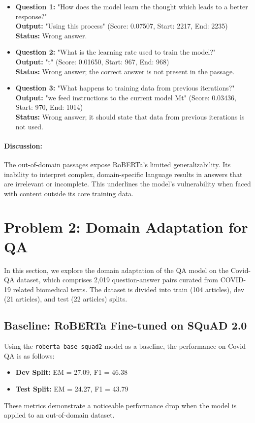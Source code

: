 \documentclass[11pt]{article}
\begin{document}
\begin{itemize}
    \item \textbf{Question 1:} "How does the model learn the thought which leads to a better response?" \\
          \textbf{Output:} "Using this process" (Score: 0.07507, Start: 2217, End: 2235) \\
          \textbf{Status:} Wrong answer.
    \item \textbf{Question 2:} "What is the learning rate used to train the model?" \\
          \textbf{Output:} "t" (Score: 0.01650, Start: 967, End: 968) \\
          \textbf{Status:} Wrong answer; the correct answer is not present in the passage.
    \item \textbf{Question 3:} "What happens to training data from previous iterations?" \\
          \textbf{Output:} "we feed instructions to the current model Mt" (Score: 0.03436, Start: 970, End: 1014) \\
          \textbf{Status:} Wrong answer; it should state that data from previous iterations is not used.
\end{itemize}
\paragraph{Discussion:} The out-of-domain passages expose RoBERTa's limited generalizability. Its inability to interpret complex, domain-specific language results in answers that are irrelevant or incomplete. This underlines the model's vulnerability when faced with content outside its core training data.

\section{Problem 2: Domain Adaptation for QA}
In this section, we explore the domain adaptation of the QA model on the Covid-QA dataset, which comprises 2,019 question-answer pairs curated from COVID-19 related biomedical texts. The dataset is divided into train (104 articles), dev (21 articles), and test (22 articles) splits.

\subsection{Baseline: RoBERTa Fine-tuned on SQuAD 2.0}
Using the \texttt{roberta-base-squad2} model as a baseline, the performance on Covid-QA is as follows:
\begin{itemize}
    \item \textbf{Dev Split:} EM = 27.09, F1 = 46.38
    \item \textbf{Test Split:} EM = 24.27, F1 = 43.79
\end{itemize}
These metrics demonstrate a noticeable performance drop when the model is applied to an out-of-domain dataset.
\end{document}
